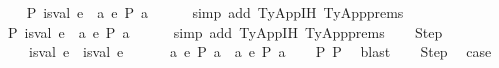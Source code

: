 \begin{isabellebody}
\ \ \isamarkupfalse%
\ P{}{\isacharcolon}{\kern0pt}\ {\isachardoublequoteopen}is{\isacharunderscore}{\kern0pt}val\ e{}\ {\isasymor}\ {\isacharparenleft}{\kern0pt}{\isasymexists}a{\isachardot}{\kern0pt}\ e{}\ {\isacharminus}{\kern0pt}{\isachargreater}{\kern0pt}{\isacharbraceleft}{\kern0pt}P{\isacharbraceright}{\kern0pt}\ a{\isacharparenright}{\kern0pt}{\isachardoublequoteclose}\isanewline
\ \ \ \ \isamarkupfalse%
\ {\isacharparenleft}{\kern0pt}simp\ add{\isacharcolon}{\kern0pt}\ TyApp{\isachardot}{\kern0pt}IH{\isacharparenleft}{\kern0pt}{}{\isacharparenright}{\kern0pt}\ TyApp{\isachardot}{\kern0pt}prems{\isacharparenright}{\kern0pt}\isanewline
\ \ \isamarkupfalse%
\ P{}{\isacharcolon}{\kern0pt}\ {\isachardoublequoteopen}is{\isacharunderscore}{\kern0pt}val\ e{}\ {\isasymor}\ {\isacharparenleft}{\kern0pt}{\isasymexists}a{\isachardot}{\kern0pt}\ e{}\ {\isacharminus}{\kern0pt}{\isachargreater}{\kern0pt}{\isacharbraceleft}{\kern0pt}P{\isacharbraceright}{\kern0pt}\ a{\isacharparenright}{\kern0pt}{\isachardoublequoteclose}\isanewline
\ \ \ \ \isamarkupfalse%
\ {\isacharparenleft}{\kern0pt}simp\ add{\isacharcolon}{\kern0pt}\ TyApp{\isachardot}{\kern0pt}IH{\isacharparenleft}{\kern0pt}{}{\isacharparenright}{\kern0pt}\ TyApp{\isachardot}{\kern0pt}prems{\isacharparenright}{\kern0pt}\isanewline
\isanewline
\ \ \isamarkupfalse%
\ Step{\isacharcolon}{\kern0pt}\isanewline
\ \ \ \ {\isachardoublequoteopen}{\isacharparenleft}{\kern0pt}is{\isacharunderscore}{\kern0pt}val\ e{}\ {\isasymand}\ is{\isacharunderscore}{\kern0pt}val\ e{}{\isacharparenright}{\kern0pt}\ {\isasymor}\isanewline
\ \ \ \ \ {\isacharparenleft}{\kern0pt}{\isasymexists}a{\isachardot}{\kern0pt}\ e{}\ {\isacharminus}{\kern0pt}{\isachargreater}{\kern0pt}{\isacharbraceleft}{\kern0pt}P{\isacharbraceright}{\kern0pt}\ a{\isacharparenright}{\kern0pt}\ {\isasymor}\ {\isacharparenleft}{\kern0pt}{\isasymexists}a{\isachardot}{\kern0pt}\ e{}\ {\isacharminus}{\kern0pt}{\isachargreater}{\kern0pt}{\isacharbraceleft}{\kern0pt}P{\isacharbraceright}{\kern0pt}\ a{\isacharparenright}{\kern0pt}{\isachardoublequoteclose}\isanewline
\ \ \isamarkupfalse%
\ P{}\ P{}\ \isamarkupfalse%
\ blast\isanewline
\isanewline
\ \ \isamarkupfalse%
\ Step\ \isamarkupfalse%
\ {\isacharquery}{\kern0pt}case\isanewline

\end{isabellebody}
